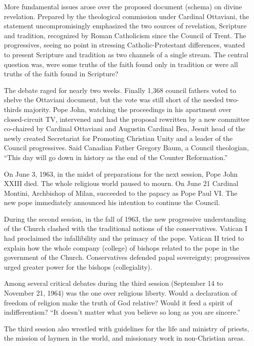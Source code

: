 More fundamental issues arose over the proposed document (schema) on divine revelation. Prepared by
the theological commission under Cardinal Ottaviani, the statement uncompromisingly emphasized the
two sources of revelation, Scripture and tradition, recognized by Roman Catholicism since the
Council of Trent. The progressives, seeing no point in stressing Catholic-Protestant differences,
wanted to present Scripture and tradition as two channels of a single stream. The central question
was, were some truths of the faith found only in tradition or were all truths of the faith found in
Scripture?

The debate raged for nearly two weeks. Finally 1,368 council fathers voted to shelve the Ottaviani
document, but the vote was still short of the needed two-thirds majority. Pope John, watching the
proceedings in his apartment over closed-circuit TV, intervened and had the proposal rewritten by a
new committee co-chaired by Cardinal Ottaviani and Augustin Cardinal Bea, Jesuit head of the newly
created Secretariat for Promoting Christian Unity and a leader of the Council progressives. Said
Canadian Father Gregory Baum, a Council theologian, “This day will go down in history as the end of
the Counter Reformation.”

On June 3, 1963, in the midst of preparations for the next session, Pope John XXIII died. The whole
religious world paused to mourn. On June 21 Cardinal Montini, Archbishop of Milan, succeeded to the
papacy as Pope Paul VI. The new pope immediately announced his intention to continue the Council.

During the second session, in the fall of 1963, the new progressive understanding of the Church
clashed with the traditional notions of the conservatives. Vatican I had proclaimed the
infallibility and the primacy of the pope. Vatican II tried to explain how the whole company
(college) of bishops related to the pope in the government of the Church. Conservatives defended
papal sovereignty; progressives urged greater power for the bishops (collegiality).

Among several critical debates during the third session (September 14 to November 21, 1964) was the
one over religious liberty. Would a declaration of freedom of religion make the truth of God
relative? Would it feed a spirit of indifferentism? “It doesn’t matter what you believe so long as
you are sincere.”

The third session also wrestled with guidelines for the life and ministry of priests, the mission of
laymen in the world, and missionary work in non-Christian areas.

